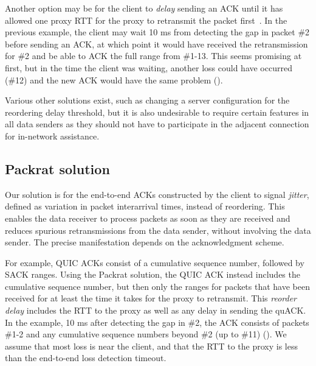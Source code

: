 Another option may be for the client to \textit{delay} sending an ACK until it
has allowed one proxy RTT for the proxy to retransmit the packet first~\cite{rfc3168}.
In the
previous example, the client may wait 10 ms from detecting the gap in
packet \#2 before sending an ACK, at which point it would have received the
retransmission for \#2 and be able to ACK the full range from \#1-13. This
seems promising at first, but in the time the client was waiting,
another loss could have occurred (\#12)
and the new ACK would have the same problem ().

Various other solutions exist, such as changing a server configuration for the
reordering delay threshold, but it
is also undesirable to require certain features in all data senders as they
should not have to participate in the adjacent connection for in-network
assistance.

\subsection{Packrat solution}
\label{sec:packrat:problem:packrat}

Our solution is for the end-to-end ACKs constructed by the client to
signal \textit{jitter}, defined as variation in packet interarrival times,
instead of reordering. This enables the data receiver to process packets as
soon as they are received and reduces spurious retransmissions from the data
sender, without involving the data sender. The precise manifestation depends on
the acknowledgment scheme.

For example, QUIC ACKs consist of a cumulative sequence number, followed by SACK
ranges. Using the Packrat solution, the QUIC ACK instead includes the
cumulative sequence number, but then only the ranges for packets that have been
received for at least the time it takes for the proxy to retransmit. This
\textit{reorder delay} includes the RTT to the proxy
as well as any delay in sending the quACK.
In the example, 10 ms after detecting the gap in \#2, the ACK consists
of packets \#1-2 and any cumulative sequence numbers beyond \#2 (up to \#11)
().
We assume
that most loss is near the client, and that the RTT to the proxy is less than
the end-to-end loss detection timeout.

